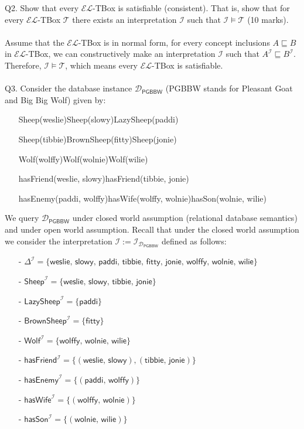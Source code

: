 \documentclass{article}
\newcommand{\el}{$\mathcal{EL}$\xspace}
\begin{document}
Q2. Show that every \el-TBox is satisfiable (consistent). That is, show that for every \el-TBox $\mathcal{T}$ there exists an interpretation $\mathcal{I}$ such that $\mathcal{I}\models\mathcal{T}$ (10 marks).\\\\
Assume that the \el-TBox is in normal form, for every concept inclusions $A\sqsubseteq B$ in \el-TBox, we can constructively make an interpretation $\mathcal{I}$ such that $A^\mathcal{I} \sqsubseteq B^\mathcal{I}$. Therefore, $\mathcal{I}\models\mathcal{T}$, which means every \el-TBox is satisfiable. \\\\
Q3. Consider the database instance $\mathcal{D}_{\textsf{PGBBW}}$ (\textsf{PGBBW} stands for \textsf{Pleasant Goat and Big Big Wolf}) given by:

\begin{itemize}
    \item[] \textsf{Sheep(weslie)}\quad\textsf{Sheep(slowy)}\quad\textsf{LazySheep(paddi)}
    \item[] \textsf{Sheep(tibbie)}\quad\textsf{BrownSheep(fitty)}\quad\textsf{Sheep(jonie)}
    \item[] \textsf{Wolf(wolffy)}\quad\textsf{Wolf(wolnie)}\quad\textsf{Wolf(wilie)}
    \item[] \textsf{hasFriend(weslie, slowy)}\quad\textsf{hasFriend(tibbie, jonie)}
    \item[] \textsf{hasEnemy(paddi, wolffy)}\quad\textsf{hasWife(wolffy, wolnie)}\quad\textsf{hasSon(wolnie, wilie)}
\end{itemize}

\noindent We query $\mathcal{D}_{\textsf{PGBBW}}$ under closed world assumption (relational database semantics) and under open world assumption. Recall that under the closed world assumption we consider the interpretation $\mathcal{I}:=\mathcal{I}_{\mathcal{D}_{\textsf{PGBBW}}}$ defined as follows:

\begin{itemize}
    \item[-] $\Delta^{\mathcal{I}}=\{\textsf{weslie, slowy, paddi, tibbie, fitty, jonie, wolffy, wolnie, wilie}\}$
    \item[-] $\textsf{Sheep}^{\mathcal{I}}=\{\textsf{weslie, slowy, tibbie, jonie}\}$
    \item[-] $\textsf{LazySheep}^{\mathcal{I}}=\{\textsf{paddi}\}$
    \item[-] $\textsf{BrownSheep}^{\mathcal{I}}=\{\textsf{fitty}\}$
    \item[-] $\textsf{Wolf}^{\mathcal{I}}=\{\textsf{wolffy, wolnie, wilie}\}$
    \item[-] $\textsf{hasFriend}^{\mathcal{I}}=\{(\textsf{weslie, slowy}),(\textsf{tibbie, jonie})\}$
    \item[-] $\textsf{hasEnemy}^{\mathcal{I}}=\{(\textsf{paddi, wolffy})\}$
    \item[-] $\textsf{hasWife}^{\mathcal{I}}=\{(\textsf{wolffy, wolnie})\}$
    \item[-] $\textsf{hasSon}^{\mathcal{I}}=\{(\textsf{wolnie, wilie})\}$
\end{itemize}
\end{document}
